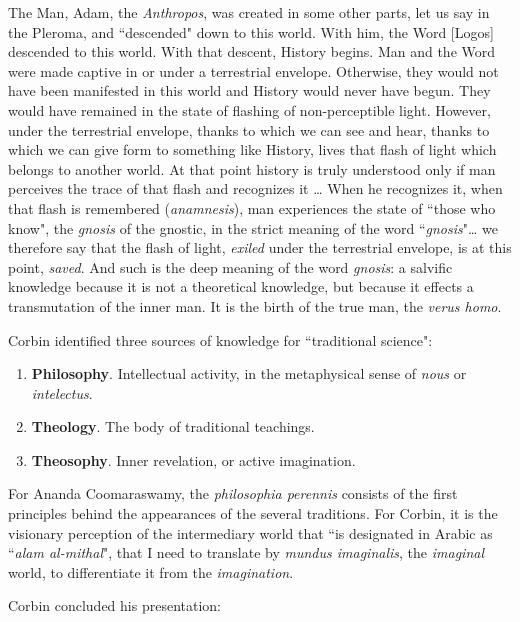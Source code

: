 \begin{quotex}
The Man, Adam, the \emph{Anthropos}, was created in some other parts, let us say in the Pleroma, and ``descended" down to this world. With him, the Word [Logos] descended to this world. With that descent, History begins. Man and the Word were made captive in or under a terrestrial envelope. Otherwise, they would not have been manifested in this world and History would never have begun. They would have remained in the state of flashing of non-perceptible light. However, under the terrestrial envelope, thanks to which we can see and hear, thanks to which we can give form to something like History, lives that flash of light which belongs to another world. At that point history is truly understood only if man perceives the trace of that flash and recognizes it … When he recognizes it, when that flash is remembered (\emph{anamnesis}), man experiences the state of ``those who know", the \emph{gnosis} of the gnostic, in the strict meaning of the word ``\emph{gnosis}"… we therefore say that the flash of light, \emph{exiled} under the terrestrial envelope, is at this point, \emph{saved}. And such is the deep meaning of the word \emph{gnosis}: a salvific knowledge because it is not a theoretical knowledge, but because it effects a transmutation of the inner man. It is the birth of the true man, the \emph{verus homo}. 

\end{quotex}
Corbin identified three sources of knowledge for ``traditional science":

\begin{enumerate}
\item \textbf{Philosophy}. Intellectual activity, in the metaphysical sense of \emph{nous} or \emph{intelectus}. 
\item \textbf{Theology}. The body of traditional teachings. 
\item \textbf{Theosophy}. Inner revelation, or active imagination. 
\end{enumerate}
For Ananda Coomaraswamy, the \emph{philosophia perennis} consists of the first principles behind the appearances of the several traditions. For Corbin, it is the visionary perception of the intermediary world that ``is designated in Arabic as ``\emph{alam al-mithal}", that I need to translate by \emph{mundus imaginalis}, the \emph{imaginal} world, to differentiate it from the \emph{imagination}.

Corbin concluded his presentation:

